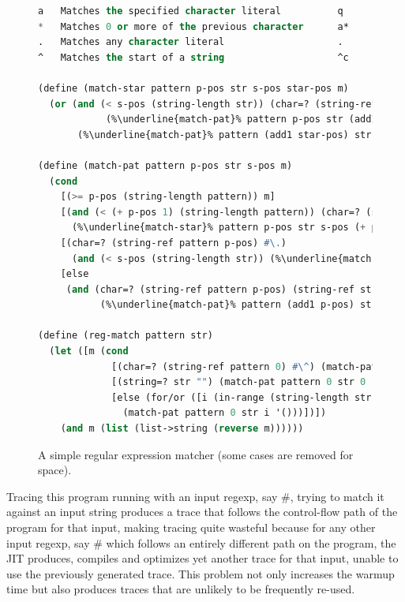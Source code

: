 \begin{figure}[h!]
  \footnotesize
  \begin{mdframed}
\begin{lstlisting}[mathescape,escapechar=\%,language=lisp]
a 	Matches the specified character literal          q       q
* 	Matches 0 or more of the previous character      a*      "", a, aa, aaa
. 	Matches any character literal                    .       a, b, c, d, e ...
^ 	Matches the start of a string                    ^c      c, ca, caa, cbb ...

(define (match-star pattern p-pos str s-pos star-pos m)
  (or (and (< s-pos (string-length str)) (char=? (string-ref pattern p-pos) (string-ref str s-pos))
            (%\underline{match-pat}% pattern p-pos str (add1 s-pos) (cons (string-ref str s-pos) m)))
       (%\underline{match-pat}% pattern (add1 star-pos) str s-pos m)))

(define (match-pat pattern p-pos str s-pos m)
  (cond
    [(>= p-pos (string-length pattern)) m]
    [(and (< (+ p-pos 1) (string-length pattern)) (char=? (string-ref pattern (+ p-pos 1)) #\*))
      (%\underline{match-star}% pattern p-pos str s-pos (+ p-pos 1) m)]
    [(char=? (string-ref pattern p-pos) #\.)
      (and (< s-pos (string-length str)) (%\underline{match-pat}% pattern (add1 p-pos) str (add1 s-pos) (cons (string-ref str s-pos) m)))]
    [else
     (and (char=? (string-ref pattern p-pos) (string-ref str s-pos))
           (%\underline{match-pat}% pattern (add1 p-pos) str (add1 s-pos) (cons (string-ref str s-pos) m)))]))

(define (reg-match pattern str)
  (let ([m (cond
             [(char=? (string-ref pattern 0) #\^) (match-pat pattern 1 str 0 '())]
             [(string=? str "") (match-pat pattern 0 str 0 '())] ; edge case
             [else (for/or ([i (in-range (string-length str))])
               (match-pat pattern 0 str i '()))])])
    (and m (list (list->string (reverse m))))))
\end{lstlisting}
\end{mdframed}
\caption{A simple regular expression matcher (some cases are removed for space).}
\label{fig:regexp}
\vspace{-0.3cm}
\end{figure}

%

Tracing this program running with an input regexp, say
$\mathtt{\#}$, trying to match it against an
input string produces a trace that follows the control-flow path of
the program for that input, making tracing quite wasteful because for
any other input regexp, say $\mathtt{\#}$ which
follows an entirely different path on the program, the JIT produces,
compiles and optimizes yet another trace for that input, unable to use
the previously generated trace. This problem not only increases the
warmup time but also produces traces that are unlikely to be
frequently re-used.


